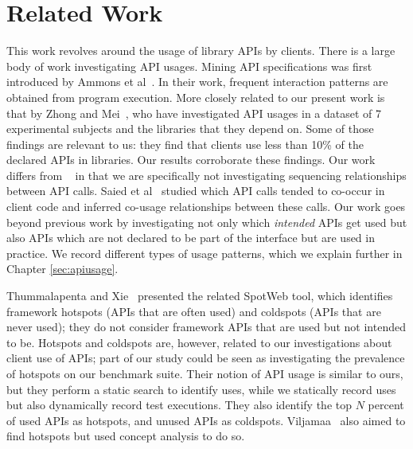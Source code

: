 \chapter{Related Work}
\label{sec:related}

This work revolves around the usage of library APIs by clients. There is a large body of work investigating API usages. Mining API specifications was first introduced by Ammons et al~\cite{AmmonsETAL02MiningSpecifications}. In their work, frequent interaction patterns are obtained from program execution. More closely related to our present work is that by Zhong and Mei~\cite{zhong19:_empir_study_api_usages}, who have investigated API usages in a dataset of 7 experimental subjects and the libraries that they depend on. Some of those findings are relevant to us: they find that clients use less than 10\% of the declared APIs in libraries. Our results corroborate these findings. Our work differs from ~\cite{zhong19:_empir_study_api_usages} in that we are specifically not investigating sequencing relationships between API calls. Saied et al~\cite{saied15:_minin_multi_api_usage_patter} studied which API calls tended to co-occur in client code and inferred co-usage relationships between these calls. Our work goes beyond previous work by investigating not only which \emph{intended} APIs get used but also APIs which are not declared to be part of the interface but are used in practice. We record different types of usage patterns, which we explain further in Chapter \ref{sec:apiusage}.

Thummalapenta and Xie~\cite{thummalapenta08:_spotw} presented the related SpotWeb tool, which identifies framework hotspots (APIs that are often used) and coldspots (APIs that are never used); they do not consider framework APIs that are used but not intended to be. Hotspots and coldspots are, however, related to our investigations about client use of APIs; part of our study could be seen as investigating the prevalence of hotspots on our benchmark suite. Their notion of API usage is similar to ours, but they perform a static search to identify uses, while we statically record uses but also dynamically record test executions. They also identify the top $N$ percent of used APIs as hotspots, and unused APIs as coldspots. Viljamaa~\cite{viljamaa03:_rever_engin_framew_reuse_inter} also aimed to find hotspots but used concept analysis to do so.

